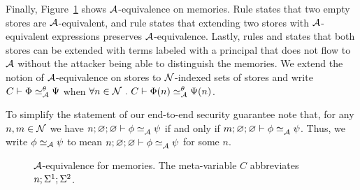 Finally, Figure~\ref{fig:low-eq-memories} shows $\mathcal{A}$-equivalence on memories. Rule  states that two empty stores are $\mathcal{A}$-equivalent, and rule  states that extending two stores with $\mathcal{A}$-equivalent expressions preserves $\mathcal{A}$-equivalence. Lastly, rules  and  states that both stores can be extended with terms labeled with a principal that does not flow to $\mathcal{A}$ without the attacker being able to distinguish the memories. We extend the notion of $\mathcal{A}$-equivalence on stores to $\mathcal{N}$-indexed sets of stores and write $\loweq{C}{\Attacker}[\bijection]{\globalstore}{\altglobalstore}$ when $\forall n \in \Nameset~.~ \loweq{C}{\Attacker}[\bijection]{\globalstore(n)}{\altglobalstore(n)}$.

To simplify the statement of our end-to-end security guarantee note that, for any $n, m \in \mathcal{N}$ we have $\loweq{n; \emptyenv; \emptyenv}{\Attacker}{\store}{\altstore}$ if and only if $\loweq{m; \emptyenv; \emptyenv}{\Attacker}{\store}{\altstore}$. Thus, we write $\phi \simeq_{\mathcal{A}} \psi$ to mean $\loweq{n; \emptyenv; \emptyenv}{\Attacker}{\store}{\altstore}$ for some $n$.

\begin{figure}
    \centering
    \caption{$\mathcal{A}$-equivalence for memories. The meta-variable $C$ abbreviates $n; \Sigma^1; \Sigma^2$.}
    \label{fig:low-eq-memories}
\end{figure}

